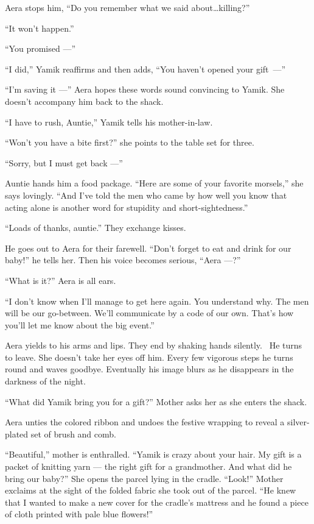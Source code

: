 \documentclass[twoside,11pt,openany]{book}
\begin{document}
Aera stops him, ``Do you remember what we said about{\ldots}killing?''

``It won't happen.''

``You promised ---''

``I did,'' Yamik reaffirms and then adds, ``You haven't opened your gift~---''

``I'm saving it ---'' Aera hopes these words sound convincing to Yamik. She doesn't accompany
him back to the shack.

``I have to rush, Auntie,'' Yamik tells his mother-in-law.

``Won't you have a bite first?'' she points to the table set for three.

``Sorry, but I must get back ---''

Auntie hands him a food package. ``Here are some of your favorite morsels,'' she says
lovingly. ``And I've told the men who came by how well you know that acting alone is another word for
stupidity and short-sightedness.''

``Loads of thanks, auntie.'' They exchange kisses.

He goes out{ }to Aera for their farewell. ``Don't forget to eat and drink for our
baby!'' he tells her. Then his voice becomes serious, ``Aera ---?''

``What is it?'' Aera is all ears.

``I don't know when I'll manage to get here again. You understand why. The men will be our go-between.
We'll communicate by a code of our own. That's how you'll let me know about the big event.''

Aera yields to his arms and lips. They end by shaking hands silently. ~He turns to leave. She doesn't take her eyes off
him. Every few vigorous steps he turns round and waves goodbye. Eventually his image blurs as he disappears in the
darkness of the night.

``What did Yamik bring you for a gift?'' Mother asks her as she enters the shack.

Aera unties the colored ribbon and undoes the festive wrapping to reveal a silver-plated set of brush and comb.

``Beautiful,'' mother is enthralled. ``Yamik is crazy about your hair. My gift is
a packet of knitting yarn --- the right gift for a grandmother. And what did he bring our baby?'' She opens
the parcel lying in the cradle. ``Look!'' Mother exclaims at the sight of the folded fabric
she took out of the parcel. ``He knew that I wanted to make a new cover for the cradle's mattress and he
found a piece of cloth printed with pale blue flowers!''
\end{document}
